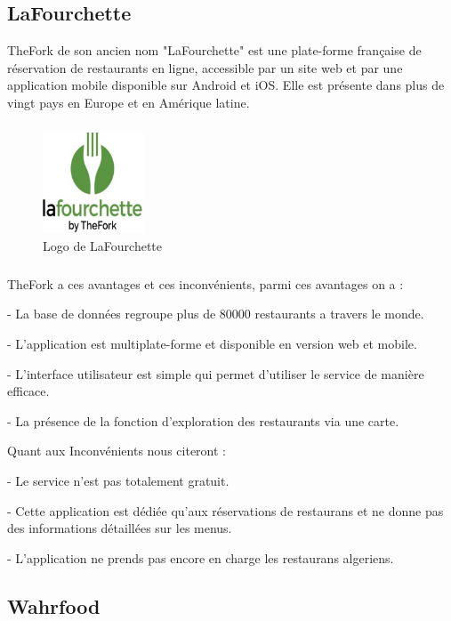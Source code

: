 \subsection{LaFourchette}
TheFork de son ancien nom "LaFourchette" est une plate-forme française de réservation de restaurants en ligne, accessible par un site web et par une application mobile disponible sur Android et iOS. Elle est présente dans plus de vingt pays en Europe et en Amérique latine.~\cite{TheFork2020}
\subparagraph*{}
\begin{figure}
    \vspace{-15pt}
    \includegraphics[width=3cm]{images/Chapitre1/lafourchette.jpg}
    \vspace{-20pt}
    \caption{{\footnotesize Logo de LaFourchette}}
\end{figure}

\subparagraph*{}
TheFork a ces avantages et ces inconvénients, parmi ces avantages on a :\bigskip

	\tab- La base de données regroupe plus de 80000 restaurants a travers le monde.~\cite{RestaurantsSiteReservation} \medskip

	\tab- L'application est multiplate-forme et disponible en version web et mobile. \medskip

	\tab- L'interface utilisateur est simple qui permet d'utiliser le service de manière efficace. \medskip

	\tab- La présence de la fonction d'exploration des restaurants via une carte.\bigskip

Quant aux Inconvénients nous citeront :\bigskip

	\tab- Le service n'est pas totalement gratuit.\medskip

	\tab- Cette application est dédiée qu'aux réservations de restaurans et ne donne pas des informations détaillées sur les menus.\medskip

	\tab- L'application ne prends pas encore en charge les restaurans algeriens. \medskip

   



\newpage
\subsection{Wahrfood}

